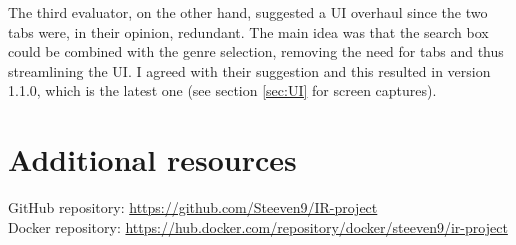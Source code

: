 \documentclass[12pt]{article}
\begin{document}
	The third evaluator, on the other hand, suggested a UI overhaul since the two tabs were, in their opinion, redundant. The main idea was that the search box could be combined with the genre selection, removing the need for tabs and thus streamlining the UI. I agreed with their suggestion and this resulted in version 1.1.0, which is the latest one (see section \ref{sec:UI} for screen captures).\\
	
	
\section{Additional resources}

	GitHub repository: \url{https://github.com/Steeven9/IR-project}\\
	
	Docker repository: \url{https://hub.docker.com/repository/docker/steeven9/ir-project}	
	
\end{document}
